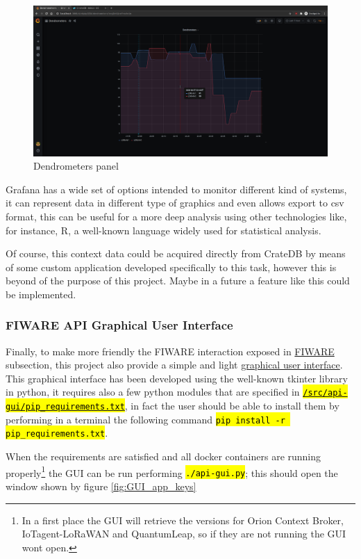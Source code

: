 \documentclass[11pt,a4paper,dvipsnames,twoside]{article}
\newcommand{\cmd}[1] {\hl{\texttt{#1}}}
\begin{document}
\begin{figure}[ht]
  \centering
  \includegraphics[width=.9\textwidth]{../pictures/Grafana_final_panel.png}
  \caption{Dendrometers panel}
  \label{fig:final_panel}
\end{figure}

Grafana has a wide set of options intended to monitor different kind of systems, it can represent data in different type of graphics and even allows export to csv format, this can be useful for a more deep analysis using other technologies like, for instance, R, a well-known language widely used for statistical analysis.

Of course, this context data could be acquired directly from CrateDB by means of some custom application developed specifically to this task, however this is beyond of the purpose of this project. Maybe in a future a feature like this could be implemented. 

\subsubsection{FIWARE API Graphical User Interface}
Finally, to make more friendly the FIWARE interaction exposed in \hyperref[sssec:FIWARE]{FIWARE} subsection, this project also provide a simple and light \href{https://github.com/WyRe/lora-arduino-dendrometer/blob/master/src/api-gui/api-gui.py}{graphical user interface}. This graphical interface has been developed using the well-known tkinter library in python, it requires also a few python modules that are specified in \href{https://github.com/WyRe/lora-arduino-dendrometer/blob/master/src/api-gui/pip_requirements.txt}{\cmd{/src/api-gui/pip\_requirements.txt}}, in fact the user should be able to install them by performing in a terminal the following command \cmd{pip install -r pip\_requirements.txt}.

When the requirements are satisfied and all docker containers are running properly\footnote{In a first place the GUI will retrieve the versions for Orion Context Broker, IoTagent-LoRaWAN and QuantumLeap, so if they are not running the GUI wont open.} the GUI can be run performing \cmd{./api-gui.py}; this should open the window shown by figure \ref{fig:GUI_app_keys}
\end{document}
